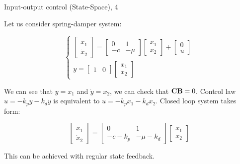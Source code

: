 \documentclass{beamer}
\begin{document}
\begin{frame}{Input-output control (State-Space), 4}
	\begin{flushleft}
		
		\begin{example}
			Let us consider spring-damper system:
			
			\begin{equation}
				\begin{cases}
					\begin{bmatrix}
						\dot x_1 \\ \dot x_2
					\end{bmatrix} = 
					\begin{bmatrix}
						0 & 1 \\
						-c & -\mu
					\end{bmatrix}
					\begin{bmatrix}
						x_1 \\ x_2
					\end{bmatrix}
					+
					\begin{bmatrix}
						0 \\ u
					\end{bmatrix}
					\\
					y = \begin{bmatrix}		1 & 0	\end{bmatrix} 
					\begin{bmatrix}
						x_1 \\ x_2
					\end{bmatrix}
				\end{cases}
			\end{equation}
			
			We can see that $y = x_1$ and $\dot y = x_2$, we can check that $\mathbf{C}\mathbf{B} = 0$. Control law $u = -k_p y - k_d \dot y$ is equivalent to $u = -k_p x_1 - k_d x_2$. Closed loop system takes form:
			
			\begin{equation}
				\begin{bmatrix}
					\dot x_1 \\ \dot x_2
				\end{bmatrix} = 
				\begin{bmatrix}
					0 & 1 \\
					-c-k_p & -\mu- k_d
				\end{bmatrix}
				\begin{bmatrix}
					x_1 \\ x_2
				\end{bmatrix}
			\end{equation}
			
			This can be achieved with regular state feedback. 
		\end{example}
		
	\end{flushleft}
\end{frame}
\end{document}
